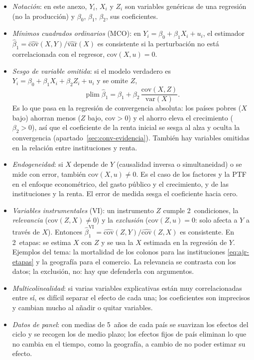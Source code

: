 \documentclass[11pt]{article}
\begin{document}
\begin{itemize}
\item \emph{Notación}: en este anexo, $Y_i$, $X_i$ y $Z_i$ son variables genéricas de una regresión (no la producción) y $\beta_0$, $\beta_1$, $\beta_2$, sus coeficientes.
\item \emph{Mínimos cuadrados ordinarios} (MCO): en $Y_i=\beta_0+\beta_1X_i+u_i$, el estimador $\hat\beta_1=\widehat{\mathrm{cov}}(X,Y)/\widehat{\mathrm{var}}(X)$ es consistente si la perturbación no está correlacionada con el regresor, $\mathrm{cov}(X,u)=0$.
\item \emph{Sesgo de variable omitida}: si el modelo verdadero es $Y_i=\beta_0+\beta_1X_i+\beta_2Z_i+u_i$ y se omite $Z$,
  \[
  \operatorname{plim}\hat\beta_1=\beta_1+\beta_2\,\frac{\mathrm{cov}(X,Z)}{\mathrm{var}(X)} .
  \]
  Es lo que pasa en la regresión de convergencia absoluta: los países pobres ($X$ bajo) ahorran menos ($Z$ bajo, $\mathrm{cov}>0$) y el ahorro eleva el crecimiento ($\beta_2>0$), así que el coeficiente de la renta inicial se sesga al alza y oculta la convergencia (apartado~\ref{sec:conv-evidencia}). También hay variables omitidas en la relación entre instituciones y renta.
\item \emph{Endogeneidad}: si $X$ depende de $Y$ (causalidad inversa o simultaneidad) o se mide con error, también $\mathrm{cov}(X,u)\neq0$. Es el caso de los factores y la PTF en el enfoque econométrico\nocite{MarschakAndrews1944}, del gasto público y el crecimiento, y de las instituciones y la renta. El error de medida sesga el coeficiente hacia cero.
\item \emph{Variables instrumentales} (VI): un instrumento $Z$ cumple 2~condiciones, la \emph{relevancia} ($\mathrm{cov}(Z,X)\neq0$) y la \emph{exclusión} ($\mathrm{cov}(Z,u)=0$: solo afecta a $Y$ a través de $X$). Entonces $\hat\beta_1^{\mathrm{VI}}=\widehat{\mathrm{cov}}(Z,Y)/\widehat{\mathrm{cov}}(Z,X)$ es consistente. En 2~etapas: se estima $X$ con $Z$ y se usa la $X$ estimada en la regresión de $Y$. Ejemplos del tema: la mortalidad de los colonos para las instituciones \eqref{eq:ajr-etapas} y la geografía para el comercio\nocite{FrankelRomer1999}. La relevancia se contrasta con los datos; la exclusión, no: hay que defenderla con argumentos.
\item \emph{Multicolinealidad}: si varias variables explicativas están muy correlacionadas entre sí, es difícil separar el efecto de cada una; los coeficientes son imprecisos y cambian mucho al añadir o quitar variables.
\item \emph{Datos de panel}: con medias de 5~años de cada país se suavizan los efectos del ciclo y se recogen los de medio plazo; los efectos fijos de país eliminan lo que no cambia en el tiempo, como la geografía, a cambio de no poder estimar su efecto\nocite{AcemogluMolina2022}.

\end{itemize}
\end{document}
